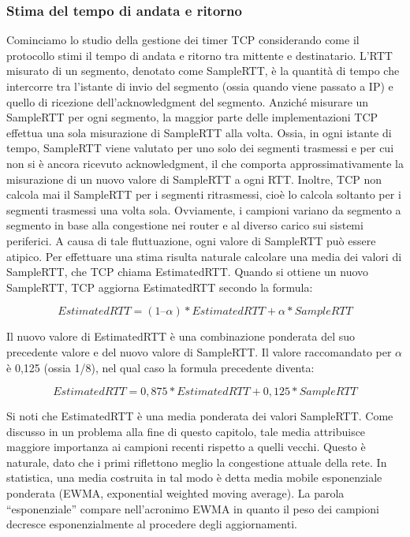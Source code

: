 \subsubsection{Stima del tempo di andata e ritorno}
Cominciamo lo studio della gestione dei timer TCP considerando come il protocollo stimi il tempo di andata e ritorno tra mittente e destinatario. L’RTT misurato di un segmento, denotato come SampleRTT, è la quantità di tempo che intercorre tra l’istante di invio del segmento (ossia quando viene passato a IP) e quello di ricezione dell’acknowledgment del segmento. Anziché misurare un SampleRTT per ogni segmento, la maggior parte delle implementazioni TCP effettua una sola misurazione di SampleRTT alla volta. Ossia, in ogni istante di tempo, SampleRTT viene valutato per
uno solo dei segmenti trasmessi e per cui non si è ancora ricevuto acknowledgment, il che comporta approssimativamente la misurazione di un nuovo valore di SampleRTT a ogni RTT. Inoltre, TCP non calcola mai il SampleRTT per i segmenti ritrasmessi, cioè lo calcola soltanto per i segmenti trasmessi una volta sola. Ovviamente, i campioni variano da segmento a segmento in base alla congestione nei router e al diverso carico sui sistemi periferici. A causa di tale fluttuazione, ogni valore di SampleRTT può essere atipico. Per effettuare una stima risulta naturale calcolare una media dei valori di SampleRTT, che TCP chiama EstimatedRTT. Quando si ottiene un nuovo SampleRTT, TCP aggiorna EstimatedRTT secondo la formula:

\begin{equation*}
    EstimatedRTT = (1 – \alpha) * EstimatedRTT + \alpha * SampleRTT    
\end{equation*}

Il nuovo valore di EstimatedRTT è una combinazione ponderata del suo precedente valore e del nuovo valore di SampleRTT. Il valore raccomandato per $\alpha$ è 0,125 (ossia 1/8), nel qual caso la formula precedente diventa:

\begin{equation*}
    EstimatedRTT = 0,875 * EstimatedRTT + 0,125 * SampleRTT    
\end{equation*}

Si noti che EstimatedRTT è una media ponderata dei valori SampleRTT. Come discusso in un problema alla fine di questo capitolo, tale media attribuisce maggiore importanza ai campioni recenti rispetto a quelli vecchi. Questo è naturale, dato che i primi riflettono meglio la congestione attuale della rete. In statistica, una media costruita in tal modo è detta media mobile esponenziale ponderata (EWMA, exponential weighted moving average). La parola “esponenziale” compare nell’acronimo EWMA in quanto il peso dei campioni decresce esponenzialmente al procedere degli aggiornamenti.


